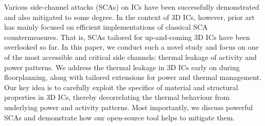 Various side-channel attacks (SCAs) on ICs have been successfully demonstrated and also mitigated to some degree.  In the context of 3D ICs, however, prior art has mainly
focused on efficient implementations of classical SCA countermeasures.
That is, SCAs tailored for up-and-coming 3D ICs have been overlooked so far.
%
In this paper, we conduct such a novel study and focus on one of the most accessible and critical side channels: thermal leakage of activity and power patterns.
We address the thermal leakage in 3D ICs early on during floorplanning,
   along with tailored extensions for power and thermal management.
%
Our key idea
is
to carefully exploit the specifics of material and structural properties in 3D ICs, thereby decorrelating the thermal behaviour from underlying power and activity patterns.
%
Most importantly, we discuss powerful SCAs and demonstrate how our open-source tool helps to mitigate them.

